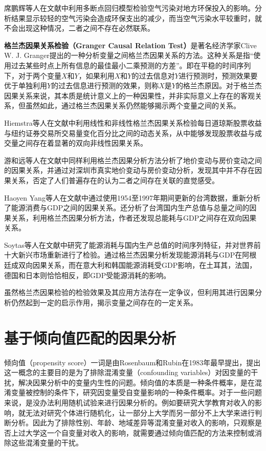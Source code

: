 席鹏辉等人在文献\cite{席鹏辉2015空气污染对地方环保投入的影响}中利用多断点回归模型检验空气污染对地方环保投入的影响。分析结果显示较轻的空气污染会造成环保支出的减少，而当空气污染水平较重时，就不会出现这种情况，二者之间不存在必然联系。


\textbf{格兰杰因果关系检验（Granger Causal Relation Test）}是著名经济学家Clive W. J. Granger提出的一种分析变量之间格兰杰因果关系的方法。这种关系是指“使用过去某些时点上所有信息的最佳最小二乘预测的方差”\cite{格}。即在平稳的时间序列下，对于两个变量$X$和$Y$，如果利用$X$和$Y$的过去信息对$Y$进行预测时，预测效果要优于单独利用$Y$的过去信息进行预测的效果，则称$X$是$Y$的格兰杰原因\cite{格}。对于格兰杰因果关系来说，其本质是统计意义上的一种因果性，并非实际意义上存在的客观关系，但虽然如此，通过格兰杰因果关系仍然能够揭示两个变量之间的关系。

Hiemstra等人在文献\cite{hiemstra1994testing}中利用线性和非线性格兰杰因果关系检验每日道琼斯股票收益与纽约证券交易所交易量变化百分比之间的动态关系，从中能够发现股票收益与成交量之间存在着显著的双向非线性因果关系。 

游和远等人在文献\cite{游和远2007基于格兰杰因果关系检验模型的地价与房价关系分析}中同样利用格兰杰因果分析方法分析了地价变动与房价变动之间的因果关系，并通过对深圳市真实地价变动与房价变动分析，发现其中并不存在因果关系，否定了人们普遍存在的认为二者之间存在关联的直觉感受。

Haoyen Yang等人在文献\cite{yang2000note}中通过使用1954至1997年期间更新的台湾数据，重新分析了能源消费与GDP之间的因果关系。还分析了台湾国内生产总值与总量之间的因果关系，利用格兰杰因果分析方法，作者还发现总能耗与GDP之间存在双向因果关系。 

Soytas等人在文献\cite{soytas2003energy}中研究了能源消耗与国内生产总值的时间序列特征，并对世界前十大新兴市场重新进行了检验。通过格兰杰因果分析发现能源消耗与GDP在阿根廷成双向因果关系，而在意大利和韩国能源消耗受GDP影响，在土耳其，法国，德国和日本则恰恰相反，即GDP受能源消耗的影响。

虽然格兰杰因果检验的检验效果及其应用方法存在一定争议\cite{庞皓1999格兰杰因果检验的有效性及其应用, 孔凡文2010格兰杰因果关系检验模型分析与应用}，但利用其进行因果分析仍然起到一定的启示作用，揭示变量之间存在的一定关系。

\section{基于倾向值匹配的因果分析}

倾向值（propensity score）一词是由Rosenbaum和Rubin在1983年最早提出\cite{rosenbaum1983central}，提出这一概念的主要目的是为了排除混淆变量（confounding variables）对因变量的干扰，解决因果分析中的变量内生性的问题。倾向值的本质是一种条件概率，是在混淆变量被控制的条件下，研究因变量受自变量影响的一种条件概率。对于一些问题来说，是没办法利用随机试验来进行因果分析的。例如要研究大学教育对收入的影响，就无法对研究个体进行随机化，让一部分上大学而另一部分不上大学来进行判断分析。因此为了排除性别、年龄、地域差异等混淆变量对收入的影响，只观察是否上过大学这一个自变量对收入的影响，就需要通过倾向值匹配的方法来控制或消除这些混淆变量的干扰。

